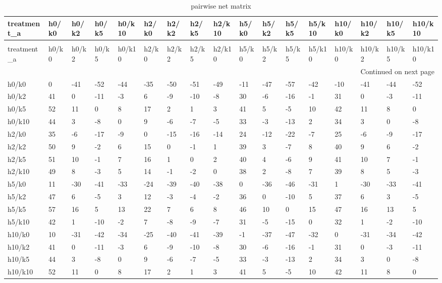 \begin{longtable}{lllllllllllllllll}
\caption{pairwise net matrix} \label{tab:pairwise_net_matrix} \\
\toprule
treatment\_a & h0/k0 & h0/k2 & h0/k5 & h0/k10 & h2/k0 & h2/k2 & h2/k5 & h2/k10 & h5/k0 & h5/k2 & h5/k5 & h5/k10 & h10/k0 & h10/k2 & h10/k5 & h10/k10 \\
\midrule
\endfirsthead
\caption[]{pairwise net matrix} \\
\toprule
treatment\_a & h0/k0 & h0/k2 & h0/k5 & h0/k10 & h2/k0 & h2/k2 & h2/k5 & h2/k10 & h5/k0 & h5/k2 & h5/k5 & h5/k10 & h10/k0 & h10/k2 & h10/k5 & h10/k10 \\
\midrule
\endhead
\midrule
\multicolumn{17}{r}{Continued on next page} \\
\midrule
\endfoot
\bottomrule
\endlastfoot
h0/k0 & 0 & -41 & -52 & -44 & -35 & -50 & -51 & -49 & -11 & -47 & -57 & -42 & -10 & -41 & -44 & -52 \\
h0/k2 & 41 & 0 & -11 & -3 & 6 & -9 & -10 & -8 & 30 & -6 & -16 & -1 & 31 & 0 & -3 & -11 \\
h0/k5 & 52 & 11 & 0 & 8 & 17 & 2 & 1 & 3 & 41 & 5 & -5 & 10 & 42 & 11 & 8 & 0 \\
h0/k10 & 44 & 3 & -8 & 0 & 9 & -6 & -7 & -5 & 33 & -3 & -13 & 2 & 34 & 3 & 0 & -8 \\
h2/k0 & 35 & -6 & -17 & -9 & 0 & -15 & -16 & -14 & 24 & -12 & -22 & -7 & 25 & -6 & -9 & -17 \\
h2/k2 & 50 & 9 & -2 & 6 & 15 & 0 & -1 & 1 & 39 & 3 & -7 & 8 & 40 & 9 & 6 & -2 \\
h2/k5 & 51 & 10 & -1 & 7 & 16 & 1 & 0 & 2 & 40 & 4 & -6 & 9 & 41 & 10 & 7 & -1 \\
h2/k10 & 49 & 8 & -3 & 5 & 14 & -1 & -2 & 0 & 38 & 2 & -8 & 7 & 39 & 8 & 5 & -3 \\
h5/k0 & 11 & -30 & -41 & -33 & -24 & -39 & -40 & -38 & 0 & -36 & -46 & -31 & 1 & -30 & -33 & -41 \\
h5/k2 & 47 & 6 & -5 & 3 & 12 & -3 & -4 & -2 & 36 & 0 & -10 & 5 & 37 & 6 & 3 & -5 \\
h5/k5 & 57 & 16 & 5 & 13 & 22 & 7 & 6 & 8 & 46 & 10 & 0 & 15 & 47 & 16 & 13 & 5 \\
h5/k10 & 42 & 1 & -10 & -2 & 7 & -8 & -9 & -7 & 31 & -5 & -15 & 0 & 32 & 1 & -2 & -10 \\
h10/k0 & 10 & -31 & -42 & -34 & -25 & -40 & -41 & -39 & -1 & -37 & -47 & -32 & 0 & -31 & -34 & -42 \\
h10/k2 & 41 & 0 & -11 & -3 & 6 & -9 & -10 & -8 & 30 & -6 & -16 & -1 & 31 & 0 & -3 & -11 \\
h10/k5 & 44 & 3 & -8 & 0 & 9 & -6 & -7 & -5 & 33 & -3 & -13 & 2 & 34 & 3 & 0 & -8 \\
h10/k10 & 52 & 11 & 0 & 8 & 17 & 2 & 1 & 3 & 41 & 5 & -5 & 10 & 42 & 11 & 8 & 0 \\
\end{longtable}
